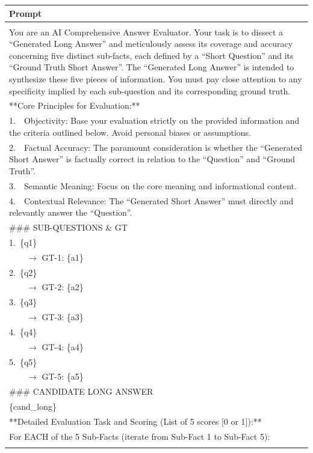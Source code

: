 \documentclass[11pt]{article}
\begin{document}
\begin{table}[t]
\scriptsize
\centering
\begin{tabular}{@{}p{\textwidth}@{}}
\hline
\textbf{Prompt} \\
\hline \hline
{\raggedright\ttfamily
***Role and Objective:***\\
You are an AI Comprehensive Answer Evaluator. Your task is to dissect a ``Generated Long Answer'' and meticulously assess its coverage and accuracy concerning five distinct sub-facts, each defined by a ``Short Question'' and its ``Ground Truth Short Answer''. The ``Generated Long Answer'' is intended to synthesize these five pieces of information. You must pay close attention to any specificity implied by each sub-question and its corresponding ground truth.\\
**Core Principles for Evaluation:**\\
1.\ \ Objectivity: Base your evaluation strictly on the provided information and the criteria outlined below. Avoid personal biases or assumptions.\\
2.\ \ Factual Accuracy: The paramount consideration is whether the ``Generated Short Answer'' is factually correct in relation to the ``Question'' and ``Ground Truth''.\\
3.\ \ Semantic Meaning: Focus on the core meaning and informational content.\\
4.\ \ Contextual Relevance: The ``Generated Short Answer'' must directly and relevantly answer the ``Question''.\\
\#\#\# SUB-QUESTIONS \& GT\\
1.\ \{q1\}\\
\ \ \ \ $\rightarrow$ GT-1: \{a1\}\\
2.\ \{q2\}\\
\ \ \ \ $\rightarrow$ GT-2: \{a2\}\\
3.\ \{q3\}\\
\ \ \ \ $\rightarrow$ GT-3: \{a3\}\\
4.\ \{q4\}\\
\ \ \ \ $\rightarrow$ GT-4: \{a4\}\\
5.\ \{q5\}\\
\ \ \ \ $\rightarrow$ GT-5: \{a5\}\\
\#\#\# CANDIDATE LONG ANSWER\\
\{cand\_long\}\\
**Detailed Evaluation Task and Scoring (List of 5 scores [0 or 1]):**\\
For EACH of the 5 Sub-Facts (iterate from Sub-Fact 1 to Sub-Fact 5):\\
}
\end{tabular}
\end{table}
\end{document}
